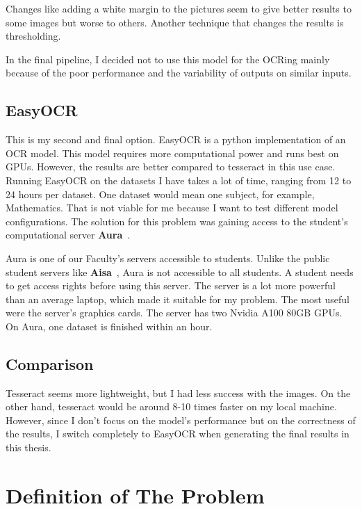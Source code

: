 \documentclass[
  digital,     %
  oneside,     %
  nosansbold,  %
  nocolorbold, %
  nolof,         %
  nolot,         %
]{fithesis4}
\begin{document}
Changes like adding a white margin to the pictures seem to give better results to some images but worse to others. Another technique that changes the results is thresholding.

In the final pipeline, I decided not to use this model for the OCRing mainly because of the poor performance and the variability of outputs on similar inputs.

\section{EasyOCR}

This is my second and final option. EasyOCR is a python implementation of an OCR model. This model requires more computational power and runs best on GPUs. However, the results are better compared to tesseract in this use case. Running EasyOCR on the datasets I have takes a lot of time, ranging from 12 to 24 hours per dataset. One dataset would mean one subject, for example, Mathematics. That is not viable for me because I want to test different model configurations. The solution for this problem was gaining access to the student's computational server \textbf{Aura}~\cite{aura}.

Aura is one of our Faculty's servers accessible to students. Unlike the public student servers like \textbf{Aisa}~\cite{aisa}, Aura is not accessible to all students. A student needs to get access rights before using this server. The server is a lot more powerful than an average laptop, which made it suitable for my problem. The most useful were the server's graphics cards. The server has two Nvidia A100 80GB GPUs. On Aura, one dataset is finished within an hour.

\section{Comparison}

Tesseract seems more lightweight, but I had less success with the images. On the other hand, tesseract would be around 8-10 times faster on my local machine. However, since I don't focus on the model's performance but on the correctness of the results, I switch completely to EasyOCR when generating the final results in this thesis.

\chapter{Definition of The Problem}\label{chap:def-of-the-problem}
\end{document}
